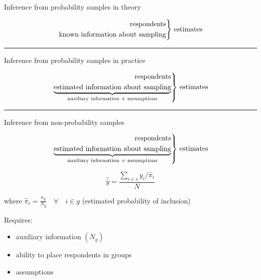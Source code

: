 \documentclass[aspectratio=169]{beamer}
\newenvironment{rcases}
  {\left.\begin{aligned}}
  {\end{aligned}\right\rbrace}
\begin{document}
\begin{frame}

\begin{center}
{\Large Inference from probability samples in theory}
\end{center}

\begin{equation*}
\begin{rcases}
  \text{respondents} \\
  \text{known information about sampling}
\end{rcases}
\text{ estimates}
\end{equation*}

\pause

\vfill
\noindent\rule{\textwidth}{0.4pt}
\begin{center}
{\Large Inference from probability samples in practice}
\end{center}

\begin{equation*}
\begin{rcases}
  \text{respondents} \\
  \underbrace{\text{estimated information about sampling}}_{\text{auxiliary information + assumptions}}
\end{rcases}
\text{ estimates}
\end{equation*}

\pause 

\vfill
\noindent\rule{\textwidth}{0.4pt}

\begin{center}
{\Large Inference from non-probability samples}
\end{center}

\begin{equation*}
\begin{rcases}
  \text{respondents} \\
  \underbrace{\text{estimated information about sampling}}_{\text{auxiliary information + assumptions}}
\end{rcases}
\text{ estimates}
\end{equation*}

\end{frame}
\begin{frame}

\begin{equation*}
\hat{\bar{y}} = \frac{\sum_{i \in s} y_i / \hat{\pi}_i }{N}
\end{equation*}

where 
$\hat{\pi}_i = \frac{n_g}{N_g} \quad \forall \quad i \in g$ (estimated probability of inclusion)

\vfill

Requires:
\begin{itemize}
\item auxiliary information $(N_g)$
\item ability to place respondents in groups
\item assumptions
\end{itemize}

\end{frame}
\end{document}
